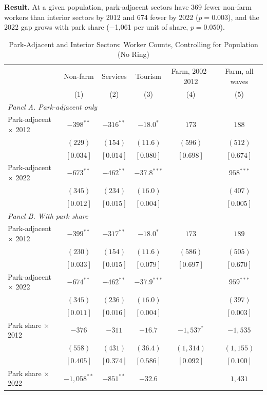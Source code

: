 \documentclass[11pt]{article}
\begin{document}
\textbf{Result.} At a given population, park-adjacent sectors have 369 fewer non-farm workers than interior sectors by 2012 and 674 fewer by 2022 ($p=0.003$), and the 2022 gap grows with park share ($-$1,061 per unit of share, $p=0.050$).
\clearpage
\begin{table}[H]
\centering\small\setlength{\tabcolsep}{4pt}
\caption{Park-Adjacent and Interior Sectors: Worker Counts, Controlling for Population (No Ring)}
\label{tab:levels_nr}
\begin{tabular}{lccccc}
\toprule
 & Non-farm & Services & Tourism & Farm, 2002--2012 & Farm, all waves \\
 & (1) & (2) & (3) & (4) & (5) \\
\midrule
\multicolumn{6}{l}{\textit{Panel A. Park-adjacent only}} \\
Park-adjacent $\times$ 2012 & $-398^{**}$ & $-316^{**}$ & $-18.0^{*}$ & $173$ & $188$ \\
 & $(229)$ & $(154)$ & $(11.6)$ & $(596)$ & $(512)$ \\
 & $[0.034]$ & $[0.014]$ & $[0.080]$ & $[0.698]$ & $[0.674]$ \\
Park-adjacent $\times$ 2022 & $-673^{**}$ & $-462^{**}$ & $-37.8^{***}$ &  & $958^{***}$ \\
 & $(345)$ & $(234)$ & $(16.0)$ &  & $(407)$ \\
 & $[0.012]$ & $[0.015]$ & $[0.004]$ &  & $[0.005]$ \\
\multicolumn{6}{l}{\textit{Panel B. With park share}} \\
Park-adjacent $\times$ 2012 & $-399^{**}$ & $-317^{**}$ & $-18.0^{*}$ & $173$ & $189$ \\
 & $(230)$ & $(154)$ & $(11.6)$ & $(586)$ & $(505)$ \\
 & $[0.033]$ & $[0.015]$ & $[0.079]$ & $[0.697]$ & $[0.670]$ \\
Park-adjacent $\times$ 2022 & $-674^{**}$ & $-462^{**}$ & $-37.9^{***}$ &  & $959^{***}$ \\
 & $(345)$ & $(236)$ & $(16.0)$ &  & $(397)$ \\
 & $[0.011]$ & $[0.016]$ & $[0.004]$ &  & $[0.003]$ \\
Park share $\times$ 2012 & $-376$ & $-311$ & $-16.7$ & $-1,537^{*}$ & $-1,535$ \\
 & $(558)$ & $(431)$ & $(36.4)$ & $(1,314)$ & $(1,155)$ \\
 & $[0.405]$ & $[0.374]$ & $[0.586]$ & $[0.092]$ & $[0.100]$ \\
Park share $\times$ 2022 & $-1,058^{**}$ & $-851^{**}$ & $-32.6$ &  & $1,431$ \\

\end{tabular}
\end{table}
\end{document}
